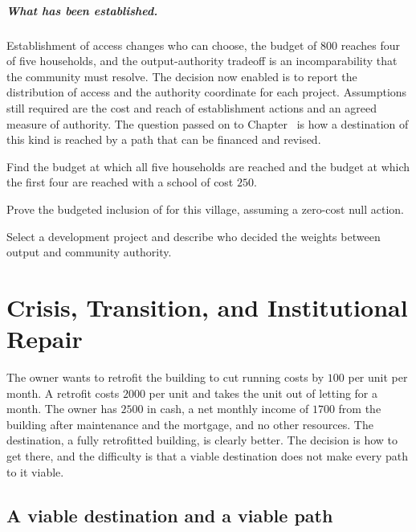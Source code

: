 \paragraph{What has been established.} Establishment of access changes who can choose, the budget of $800$ reaches four of five households, and the output-authority tradeoff is an incomparability that the community must resolve. The decision now enabled is to report the distribution of access and the authority coordinate for each project. Assumptions still required are the cost and reach of establishment actions and an agreed measure of authority. The question passed on to Chapter~ is how a destination of this kind is reached by a path that can be financed and revised.

\begin{exercise}
Find the budget at which all five households are reached and the budget at which the first four are reached with a school of cost $250$.
\end{exercise}
\begin{exercise}
Prove the budgeted inclusion of  for this village, assuming a zero-cost null action.
\end{exercise}
\begin{exercise}
Select a development project and describe who decided the weights between output and community authority.
\end{exercise}

\chapter{Crisis, Transition, and Institutional Repair}\label{ch:40}

The owner wants to retrofit the building to cut running costs by $100$ per unit per month. A retrofit costs $2000$ per unit and takes the unit out of letting for a month. The owner has $2500$ in cash, a net monthly income of $1700$ from the building after maintenance and the mortgage, and no other resources. The destination, a fully retrofitted building, is clearly better. The decision is how to get there, and the difficulty is that a viable destination does not make every path to it viable.

\section{A viable destination and a viable path}

